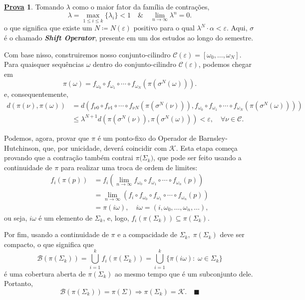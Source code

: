 \documentclass{article}
\theoremstyle{definition}
\newtheorem*{proof*}{\underline{Prova}}
\renewcommand\qedsymbol{$\blacksquare$}
\begin{document}
\begin{proof*}
	Tomando \(\lambda \) como o maior fator da família de contrações,
	\[
		\lambda =\max_{1\leq i\leq k}\{\lambda_{i}\} < 1 \quad\&\quad \lim_{n\to \infty}\lambda^{n}=0.
	\]
	o que significa que existe um \(N\coloneqq N(\varepsilon )\) positivo para o qual		\(\lambda^{N}\cdot \alpha < \varepsilon\). Aqui, \(\sigma \) é o chamado \textit{\textbf{Shift Operator}},
	presente em um dos estudos ao longo do semestre.

	Com base nisso, construiremos nosso conjunto-cilindro \(\mathcal{C}(\varepsilon ) = [\omega_{0}, \dotsc , \omega_{N}]\).
	Para quaisquer sequências \(\omega \) dentro do conjunto-cilindro \(\mathcal{C}(\varepsilon )\), podemos chegar em
	\[
		\pi (\omega ) = f_{\omega_{0}}\circ f_{\omega_{1}}\circ\cdots\circ f_{\omega_{N}}(\pi(\sigma^{N}(\omega ))).
	\]
	e, consequentemente,
	\begin{align*}
		d(\pi (\nu), \pi (\omega )) & = d(f_{\nu{0}}\circ f_{\nu{1}}\circ\cdots\circ f_{\nu{N}}(\pi(\sigma^{N}(\nu ))), f_{\omega_{0}}\circ f_{\omega_{1}}\circ\cdots\circ f_{\omega_{N}}(\pi(\sigma^{N}(\omega )))) \\
		                            & \leq \lambda^{N+1}d(\pi(\sigma^{N}(\nu)), \pi(\sigma^{N}(\omega)))<\varepsilon ,\quad \forall \nu\in \mathcal{C}.
	\end{align*}

	Podemos, agora, provar que \(\pi \) é um ponto-fixo do Operador de Barnsley-Hutchinson, que, por unicidade, deverá coincidir com \(\mathcal{K}\).
	Esta etapa começa provando que a contração também contrai \(\pi \bigl(\Sigma_{k} \bigr)\), que pode ser feito usando a continuidade de \(\pi \)
	para realizar uma troca de ordem de limites:
	\begin{align*}
		f_{i}(\pi(p)) & = f_{i}(\lim_{n\to \infty}f_{\omega_{0}}\circ f_{\omega_{1}}\circ\cdots\circ f_{\omega_{n}}(p))       \\
		              & = \lim_{n\to \infty}(f_{i}\circ f_{\omega_{0}}\circ f_{\omega_{1}}\circ\cdots\circ f_{\omega_{n}}(p)) \\
		              & = \pi(i\omega ),\quad i\omega = (i, \omega_{0}, \dotsc , \omega_{n}, \dotsc ),
	\end{align*}
	ou seja, \(i\omega \) é um elemento de \(\Sigma_{k} \), e, logo, \(f_{i}(\pi(\Sigma_{k}))\subseteq \pi(\Sigma_{k})\).

	Por fim, usando a continuidade de \(\pi \) e a compacidade de \(\Sigma_{k} , \; \pi(\Sigma_{k})\) deve ser compacto, o que significa que
	\[
		\mathcal{B}(\pi(\Sigma_{k}))=\bigcup_{i=1}^{k}f_{i}(\pi(\Sigma_{k}))=\bigcup_{i=1}^{k}\{\pi(i\omega ):\;\omega \in \Sigma_{k}\}
	\]
	é uma cobertura aberta de \(\pi(\Sigma_{k})\) ao mesmo tempo que é um subconjunto dele. Portanto,
	\[
		\mathcal{B}(\pi(\Sigma_{k}))=\pi(\Sigma ) \Rightarrow \pi(\Sigma_{k})=\mathcal{K}.\quad \text{\qedsymbol}
	\]
\end{proof*}
\end{document}
